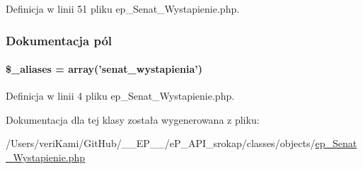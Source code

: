 Definicja w linii 51 pliku ep\-\_\-\-Senat\-\_\-\-Wystapienie.\-php.



\subsubsection{Dokumentacja pól}
\hypertarget{classep___senat___wystapienie_ab4e31d75f0bc5d512456911e5d01366b}{
\paragraph[{\$\-\_\-aliases}]{\setlength{\rightskip}{0pt plus 5cm}\$\-\_\-aliases = array('senat\-\_\-wystapienia')}}\label{classep___senat___wystapienie_ab4e31d75f0bc5d512456911e5d01366b}


Definicja w linii 4 pliku ep\-\_\-\-Senat\-\_\-\-Wystapienie.\-php.



Dokumentacja dla tej klasy została wygenerowana z pliku\-:\begin{DoxyCompactItemize}
\item 
/\-Users/veri\-Kami/\-Git\-Hub/\-\_\-\-\_\-\-E\-P\-\_\-\-\_\-/e\-P\-\_\-\-A\-P\-I\-\_\-srokap/classes/objects/\hyperlink{ep___senat___wystapienie_8php}{ep\-\_\-\-Senat\-\_\-\-Wystapienie.\-php}\end{DoxyCompactItemize}
